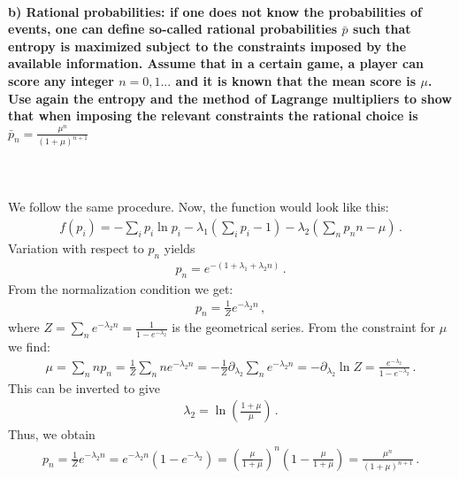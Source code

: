 \paragraph{b) Rational probabilities: if one does not know the 
    probabilities of events, one can define so-called 
    rational probabilities $\bar{p}$ such that entropy is maximized 
    subject to the constraints imposed by the available information.
    Assume that in a certain game, a player can score any integer 
    $n=0,1...$ and it is known that the mean score is $\mu$. Use again
    the entropy and the method of Lagrange multipliers to show that 
    when imposing the relevant constraints the rational choice is 
    $\bar{p}_n=\frac{\mu^n}{(1+\mu)^{n+1}}$
} \ \\
\\
    We follow the same procedure. Now, the function would look like this:
    \begin{align}
    f(p_i)=-\sum_i p_i\ln p_i - \lambda_1 \left( \sum_i p_i - 1 \right) - \lambda_2 \left(\sum_n p_nn-\mu\right) \,.
    \end{align}
    Variation with respect to $p_n$ yields
    \begin{align}
    p_n = e^{- (1 + \lambda_1 + \lambda_2 n)} \,.
    \end{align}
    From the normalization condition we get:
    \begin{align}
    p_n = \frac{1}{Z} e^{- \lambda_2 n} \,,
    \end{align}
    where $Z = \sum_n e^{- \lambda_2 n} = \frac{1}{1-e^{- \lambda_2}}$ is the geometrical series. From the constraint for $\mu$ we find:
    \begin{align}
        \mu = \sum_n n p_n = \frac{1}{Z} \sum_n n e^{-\lambda_2 n} = - \frac{1}{Z} \partial_{\lambda_2} \sum_n e^{-\lambda_2 n} = - \partial_{\lambda_2} \ln Z = \frac{e^{-\lambda_2}}{1-e^{-\lambda_2}} \,.
    \end{align}
    This can be inverted to give
    \begin{align}
    \lambda_2 = \ln\left(\frac{1+\mu}{\mu}\right) \,.
    \end{align}
    Thus, we obtain
    \begin{align}
    p_n = \frac{1}{Z} e^{- \lambda_2 n} = e^{- \lambda_2 n} \left(1-e^{-\lambda_2}\right) = \left(\frac{\mu}{1+\mu}\right)^n \left(1-\frac{\mu}{1+\mu}\right) = \frac{\mu^n}{(1+\mu)^{n+1}} \,.
    \end{align}
